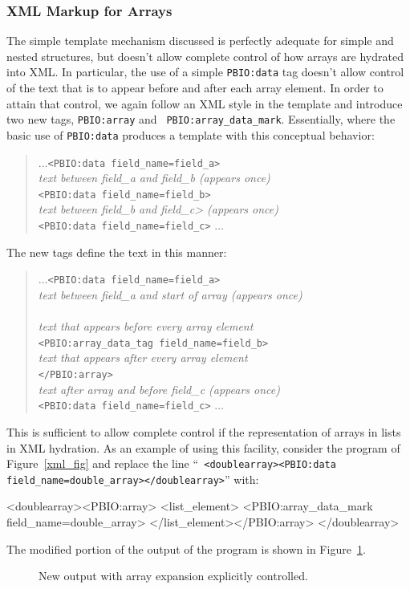 \subsubsection{XML Markup for Arrays}
The simple template mechanism discussed is perfectly adequate for simple
and nested structures, but doesn't allow complete control of how arrays are
hydrated into XML.  In particular, the use of a simple {\tt PBIO:data} tag
doesn't allow control of the text that is to appear before and after each
array element.  In order to attain that control, we again follow an XML
style in the template and introduce two new tags, {\tt PBIO:array} and {\tt
PBIO:array\_data\_mark}.  Essentially, where the basic use of {\tt PBIO:data}
produces a template with this conceptual behavior:
\begin{quote}
\small
$\dots${\tt <PBIO:data field\_name=field\_a>}\\
{\it text between field\_a and field\_b (appears once)}\\
{\tt <PBIO:data field\_name=field\_b>}\\
{\it text between field\_b and field\_c> (appears once)}\\
{\tt <PBIO:data field\_name=field\_c>}
$\dots$
\end{quote}
The new tags define the text in this manner:
\begin{quote}
\small
$\dots${\tt <PBIO:data field\_name=field\_a>}\\
{\it text between field\_a and start of array (appears once)}\\
{\tt <PBIO:array>}\\
{\it text that appears before every array element}\\
{\tt <PBIO:array\_data\_tag field\_name=field\_b>}\\
{\it text that appears after every array element}\\
{\tt </PBIO:array>}\\
{\it text after array and before field\_c (appears once)}\\
{\tt <PBIO:data field\_name=field\_c>}
$\dots$
\end{quote}
This is sufficient to allow complete control if the representation of arrays in
lists in XML hydration.  As an example of using this facility, consider the
program of Figure~\ref{xml_fig} and replace the line ``{\tt
<doublearray><PBIO:data field\_name=double\_array></doublearray>}'' with:
\begin{Code}
	<doublearray><PBIO:array>
	    <list_element>
		<PBIO:array_data_mark field_name=double_array>
	    </list_element></PBIO:array>
	</doublearray>
\end{Code}
The modified portion of the  output of the program is shown in Figure~\ref{xml_output2}.
\begin{figure}[t]
\caption{New output with array expansion explicitly controlled.\label{xml_output2}}
\end{figure}

